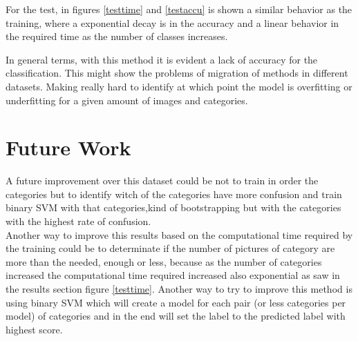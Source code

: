 \documentclass[10pt,twocolumn,letterpaper]{article}
\begin{document}
For the test, in figures \ref{testtime} and \ref{testaccu} is shown a similar behavior as the training, where a exponential decay is in the accuracy and a linear behavior in the required time as the number of classes increases.

In general terms, with this method it is evident a lack of accuracy for the classification. This might show the problems of migration of methods in different datasets. Making really hard to identify at which point the model is overfitting or underfitting for a given amount of images and categories.
\section{Future Work}
A future improvement over this dataset could be not to train in order the categories but to identify witch of the categories have more confusion and train binary SVM with that categories,kind of bootstrapping but with the categories with the highest rate of confusion.\\
Another way to improve this results based on the computational time required by the training could be to determinate if the number of pictures of category are more than the needed, enough or less, because as the number of categories increased the computational time required increased also exponential as saw in the results section figure \ref{testtime}. Another way to try to improve this method is using binary SVM which will create a model for each pair (or less categories per model) of categories and in the end will set the label to the predicted label with highest score.


{\small


}
\end{document}
